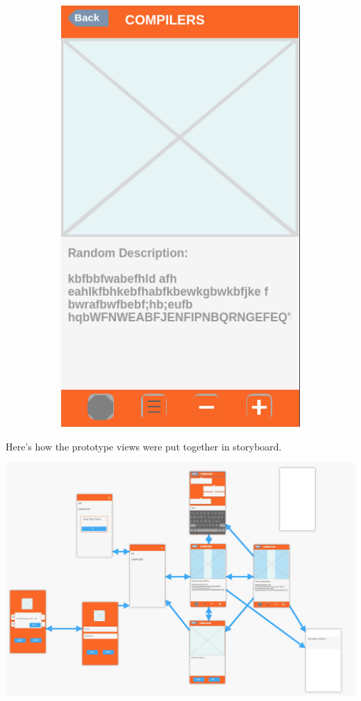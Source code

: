 \documentclass{article}
\begin{document}
\begin{figure}[ht]
\begin{subfigure}{}
			\includegraphics[scale=0.25]{fluidcard.png}
	\end{subfigure}
\end{figure}

Here's how the prototype views were put together in storyboard.
\begin{center}
	\vspace{1mm}
	\includegraphics[scale=0.25]{fluidstory.png}
	\vspace{1mm}
\end{center}
\end{document}
